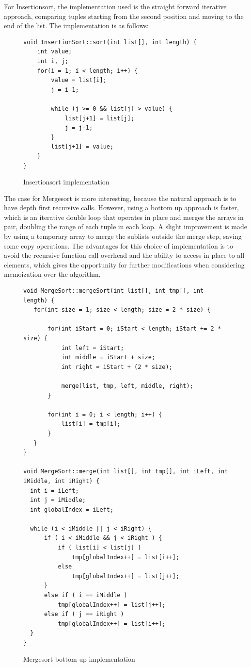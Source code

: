 \documentclass[a4paper,12pt]{article}
\begin{document}
For Insertionsort, the implementation used is the straight forward iterative approach, comparing tuples starting from the second position and moving to the end of the list. The implementation is as follows:

\begin{figure}[H]
\begin{small}
\begin{verbatim}
void InsertionSort::sort(int list[], int length) {
    int value;
    int i, j;
    for(i = 1; i < length; i++) {
        value = list[i];
        j = i-1;
        
        while (j >= 0 && list[j] > value) {
            list[j+1] = list[j];
            j = j-1;
        }
        list[j+1] = value;
    }
}
\end{verbatim}
\end{small}
\caption{Insertionsort implementation}
\end{figure}


The case for Mergesort is more interesting, because the natural approach is to have depth first  recursive calls. However, using a bottom up approach is faster, which is an iterative double loop that operates in place and merges the arrays in pair, doubling the range of each tuple in each loop. A slight improvement is made by using a temporary array to merge the sublists outside the merge step, saving some copy operations. The advantages for this choice of implementation is to avoid the recursive function call overhead and the ability to access in place to all elements, which gives the opportunity for further modifications when considering memoization over the algorithm.

\begin{figure}[H]
\begin{small}
\begin{verbatim}
void MergeSort::mergeSort(int list[], int tmp[], int length) {
   for(int size = 1; size < length; size = 2 * size) { 

       for(int iStart = 0; iStart < length; iStart += 2 * size) {
           int left = iStart;
           int middle = iStart + size;
           int right = iStart + (2 * size);

           merge(list, tmp, left, middle, right);
       }
       
       for(int i = 0; i < length; i++) {
           list[i] = tmp[i];
       }
   }
}

void MergeSort::merge(int list[], int tmp[], int iLeft, int iMiddle, int iRight) {
  int i = iLeft;
  int j = iMiddle;
  int globalIndex = iLeft;

  while (i < iMiddle || j < iRight) {
      if ( i < iMiddle && j < iRight ) {
          if ( list[i] < list[j] )
              tmp[globalIndex++] = list[i++];
          else
              tmp[globalIndex++] = list[j++];
      }
      else if ( i == iMiddle )
          tmp[globalIndex++] = list[j++];
      else if ( j == iRight )
          tmp[globalIndex++] = list[i++];
  }
}
\end{verbatim}
\end{small}
\caption{Mergesort bottom up implementation}
\end{figure}
\end{document}

